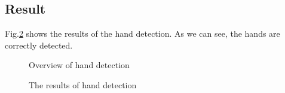 \subsection{Result}
Fig.\ref{fig:hands} shows the results of the hand detection.
As we can see, the hands are correctly detected.

\begin{landscape}
\begin{figure}[htbp]
 \centering
 
 \caption{Overview of hand detection}
 \label{fig:hand}
\end{figure}
\end{landscape}

\begin{landscape}
\begin{figure}[htbp]
 \centering
 
 \caption{The results of hand detection}
 \label{fig:hands}
\end{figure}
\end{landscape}
